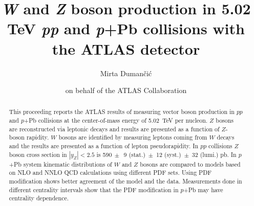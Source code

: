 \documentclass[3p,times,twocolumn]{elsarticle}
\newcommand*{\pPb}{\ensuremath{p}+Pb\xspace}
\newcommand*{\Zboson}{\ensuremath{Z}\xspace}
\newcommand*{\Wboson}{\ensuremath{W}\xspace}
\newcommand*{\pp}{\ensuremath{pp}\xspace}
\begin{document}

\begin{frontmatter}



\dochead{}

\title{\textit{W} and \textit{Z} boson production in 5.02 TeV \textit{pp} and \textit{p}+Pb collisions with the ATLAS detector}


\author{Mirta Duman\v{c}i\'{c}}
\author{on behalf of the ATLAS Collaboration}

\address{Department of Particle Physics and Astrophysics, Weizmann Institute of Science}


\begin{abstract}

This proceeding reports the ATLAS results of measuring vector boson production in \pp and \pPb collisions at the center-of-mass energy of 5.02~TeV per nucleon. \Zboson bosons are reconstructed via leptonic decays and results are presented as a function of $Z$-boson rapidity. \Wboson bosons are identified by measuring leptons coming from \Wboson decays and the results are presented as a function of lepton pseudorapidity. In \pp collisions \Zboson boson cross section in $|y_{Z}|<2.5$ is 590$~\pm$~9 (stat.)~$\pm$~12 (syst.)~$\pm$~32 (lumi.) pb. In \pPb system kinematic distributions of \Wboson and \Zboson bosons are compared to models based on NLO and NNLO QCD calculations using different PDF sets. Using PDF modification shows better agreement of the model and the data. Measurements done in different centrality intervals show that the PDF modification in \pPb may have centrality dependence. 


\end{abstract}
\end{frontmatter}
\end{document}
